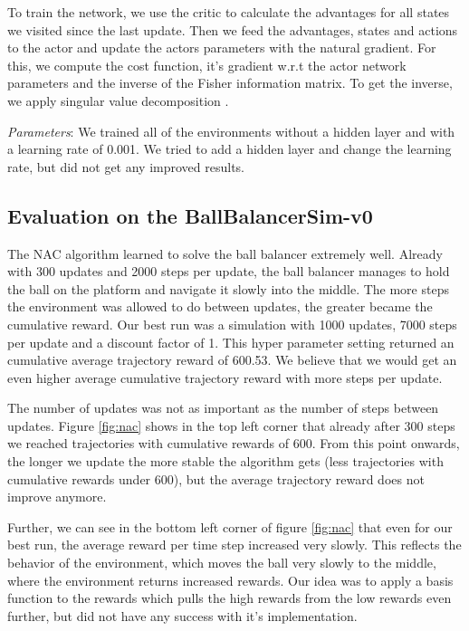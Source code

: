 To train the network, we use the critic to calculate the advantages for all states we visited since the last update. Then we feed the advantages, states and actions to the actor and update the actors parameters with the natural gradient. For this, we compute the cost function, it's gradient w.r.t the actor network parameters and the inverse of the Fisher information matrix. To get the inverse, we apply singular value decomposition \citep{golub1965calculating}.

\textit{Parameters}: We trained all of the environments without a hidden layer and with a learning rate of 0.001. We tried to add a hidden layer and change the learning rate, but did not get any improved results.

\subsection{Evaluation on the BallBalancerSim-v0}

The NAC algorithm learned to solve the ball balancer extremely well. Already with 300 updates and 2000 steps per update, the ball balancer manages to hold the ball on the platform and navigate it slowly into the middle. The more steps the environment was allowed to do between updates, the greater became the cumulative reward. Our best run was a simulation with 1000 updates, 7000 steps per update and a discount factor of 1. This hyper parameter setting returned an cumulative average trajectory reward of 600.53. We believe that we would get an even higher average cumulative trajectory reward with more steps per update. 

The number of updates was not as important as the number of steps between updates. Figure \ref{fig:nac} shows in the top left corner that already after 300 steps we reached trajectories with cumulative rewards of 600. From this point onwards, the longer we update the more stable the algorithm gets (less trajectories with cumulative rewards under 600), but the average trajectory reward does not improve anymore.

Further, we can see in the bottom left corner of figure \ref{fig:nac} that even for our best run, the average reward per time step increased very slowly. This reflects the behavior of the environment, which moves the ball very slowly to the middle, where the environment returns increased rewards. Our idea was to apply a basis function to the rewards which pulls the high rewards from the low rewards even further, but did not have any success with it's implementation.

